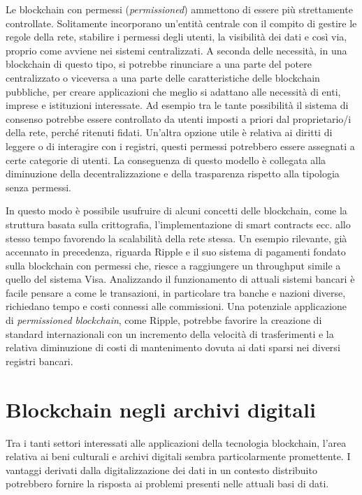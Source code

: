 Le blockchain con permessi (\emph{permissioned}) ammettono di essere più strettamente controllate. Solitamente incorporano un’entità centrale con il compito di gestire le regole della rete, stabilire i permessi degli utenti, la visibilità dei dati e così via, proprio come avviene nei sistemi centralizzati. A seconda delle necessità, in una blockchain di questo tipo, si potrebbe rinunciare a una parte del potere centralizzato o viceversa a una parte delle caratteristiche delle blockchain pubbliche, per creare applicazioni che meglio si adattano alle necessità di enti, imprese e istituzioni interessate. Ad esempio tra le tante possibilità il sistema di consenso potrebbe essere controllato da utenti imposti a priori dal proprietario/i della rete, perché ritenuti fidati. Un'altra opzione utile è relativa ai diritti di leggere o di interagire con i registri, questi permessi potrebbero essere assegnati a certe categorie di utenti. La conseguenza di questo modello è collegata alla diminuzione della decentralizzazione e della trasparenza rispetto alla tipologia senza permessi.

In questo modo è possibile usufruire di alcuni concetti delle blockchain, come la struttura basata sulla crittografia, l’implementazione di smart contracts ecc. allo stesso tempo favorendo la scalabilità della rete stessa. Un esempio rilevante, già accennato in precedenza, riguarda Ripple e il suo sistema di pagamenti fondato sulla blockchain con permessi che, riesce a raggiungere un throughput simile a quello del sistema Visa. Analizzando il funzionamento di attuali sistemi bancari è facile pensare a come le transazioni, in particolare tra banche e nazioni diverse, richiedano tempo e costi connessi alle commissioni. Una potenziale applicazione di \emph{permissioned blockchain}, come Ripple, potrebbe favorire la creazione di standard internazionali con un incremento della velocità di trasferimenti e la relativa diminuzione di costi di mantenimento dovuta ai dati sparsi nei diversi registri bancari.

\section{Blockchain negli archivi digitali} %
\label{sectionDigitalArchives}

Tra i tanti settori interessati alle applicazioni della tecnologia blockchain, l’area relativa ai beni culturali e archivi digitali sembra particolarmente promettente. I vantaggi derivati dalla digitalizzazione dei dati in un contesto distribuito potrebbero fornire la risposta ai problemi presenti nelle attuali basi di dati.

